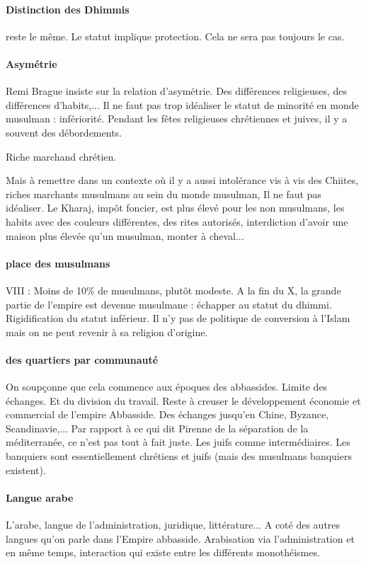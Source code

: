\paragraph{Distinction des Dhimmis} reste le même. Le statut implique protection. Cela ne sera pas toujours le cas. 

\paragraph{Asymétrie} Remi Brague insiste sur la relation d'asymétrie.  Des différences religieuses, des différences d'habits,... Il ne faut pas trop idéaliser le statut de minorité en monde musulman : infériorité.
Pendant les fêtes religieuses chrétiennes et juives, il y a souvent des débordements. 
\begin{Ex}
Riche marchand chrétien. 
\end{Ex}

Mais à remettre dans un contexte où il y a aussi intolérance vis à vis des Chiites, riches marchants musulmans au sein du monde musulman,  Il ne faut pas idéaliser. Le Kharaj, impôt foncier, est plus élevé pour les non musulmans, les habits avec des couleurs différentes, des rites autorisés, interdiction d'avoir une maison plus élevée qu'un musulman, monter à cheval...

\paragraph{place des musulmans}
VIII : Moins de 10\% de musulmans, plutôt modeste. A la fin du X, la grande partie de l'empire est devenue musulmane : échapper au statut du dhimmi. Rigidification du statut inférieur. Il n'y pas de politique de conversion à l'Islam mais on ne peut revenir à sa religion d'origine.  

\paragraph{des quartiers par communauté} On soupçonne que cela commence aux époques des abbassides. Limite des échanges. Et du division du travail. Reste à creuser le développement économie et commercial de l'empire Abbasside. Des échanges jusqu'en Chine, Byzance, Scandinavie,...
Par rapport à ce qui dit Pirenne de la séparation de la méditerranée, ce n'est pas tout à fait juste. Les juifs comme intermédiaires.
Les banquiers sont essentiellement chrétiens et juifs (mais des musulmans banquiers existent).


\paragraph{Langue arabe} L'arabe, langue de l'administration, juridique, littérature... A coté des autres langues qu'on parle dans l'Empire abbasside. Arabisation via l'administration et en même temps, interaction qui existe entre les différents monothéismes. 

